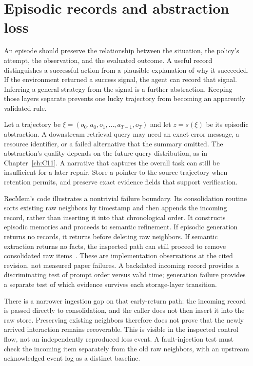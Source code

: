 \section{Episodic records and abstraction loss}\label{sec:C14:episodes}
An episode should preserve the relationship between the situation, the policy's attempt, the observation, and the evaluated outcome. A useful record distinguishes a successful action from a plausible explanation of why it succeeded. If the environment returned a success signal, the agent can record that signal. Inferring a general strategy from the signal is a further abstraction. Keeping those layers separate prevents one lucky trajectory from becoming an apparently validated rule.

Let a trajectory be $\xi=(o_0,a_0,o_1,\ldots,a_{T-1},o_T)$ and let $z=s(\xi)$ be its episodic abstraction. A downstream retrieval query may need an exact error message, a resource identifier, or a failed alternative that the summary omitted. The abstraction's quality depends on the future query distribution, as in Chapter~\ref{ch:C11}. A narrative that captures the overall task can still be insufficient for a later repair. Store a pointer to the source trajectory when retention permits, and preserve exact evidence fields that support verification.

RecMem's code illustrates a nontrivial failure boundary. Its consolidation routine sorts existing raw neighbors by timestamp and then appends the incoming record, rather than inserting it into that chronological order. It constructs episodic memories and proceeds to semantic refinement. If episodic generation returns no records, it returns before deleting raw neighbors. If semantic extraction returns no facts, the inspected path can still proceed to remove consolidated raw items~\cite{repo_recmem2026}. These are implementation observations at the cited revision, not measured paper failures. A backdated incoming record provides a discriminating test of prompt order versus valid time; generation failure provides a separate test of which evidence survives each storage-layer transition.

There is a narrower ingestion gap on that early-return path: the incoming record is passed directly to consolidation, and the caller does not then insert it into the raw store. Preserving existing neighbors therefore does not prove that the newly arrived interaction remains recoverable. This is visible in the inspected control flow, not an independently reproduced loss event. A fault-injection test must check the incoming item separately from the old raw neighbors, with an upstream acknowledged event log as a distinct baseline.

